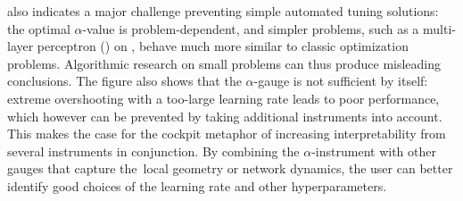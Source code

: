  also indicates a major challenge preventing simple
automated tuning solutions: the optimal $\alpha$-value is problem-dependent, and
simpler problems, such as a multi-layer perceptron (\mlp) on \mnist
\citep{lecun1998gradient}, behave much more similar to classic optimization problems.
Algorithmic research on small problems can thus produce misleading conclusions.
The figure also shows that the $\alpha$-gauge is not sufficient by itself:
extreme overshooting with a too-large learning rate leads to poor performance,
which however can be prevented by taking additional instruments into account.
This makes the case for the cockpit metaphor of increasing interpretability from
several instruments in conjunction. By combining the $\alpha$-instrument with
other gauges that capture the local geometry or network dynamics, the user can
better identify good choices of the learning rate and other hyperparameters.

